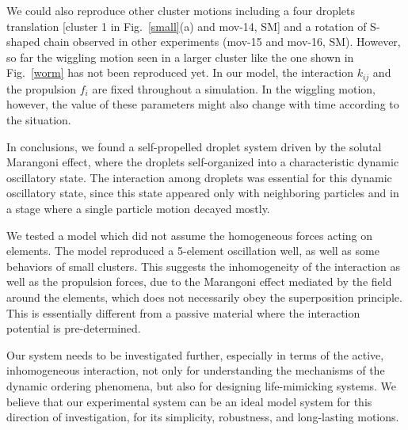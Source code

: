 \documentclass[showpacs]{revtex4-1}
\begin{document}
We could also reproduce other cluster
motions including a four droplets translation [cluster 1 in
Fig.~\ref{small}(a) and mov-14, SM] and a rotation of S-shaped chain
observed in other experiments (mov-15 and mov-16, SM).  However, so far
the wiggling motion seen in a larger cluster like the one shown in
Fig.~\ref{worm} has not been reproduced yet. In our model, the
interaction $k_{ij}$ and the propulsion $f_i$ are fixed throughout a
simulation. In the wiggling motion, however, the value of these
parameters might also change with time according to the situation.

 In conclusions, we found a self-propelled droplet system driven by the
solutal Marangoni effect, where the droplets self-organized into a
characteristic dynamic oscillatory state. The interaction among droplets
was essential for this dynamic oscillatory state, since this state
appeared only with neighboring particles and in a stage where a
single particle motion decayed mostly.

We tested a model which did not assume the homogeneous forces acting on
elements. The model reproduced a 5-element oscillation well, as well as
some behaviors of small clusters. This suggests the inhomogeneity of the
interaction as well as the propulsion forces, due to the Marangoni
effect mediated by the field around the elements, which does not
necessarily obey the superposition principle. This is essentially
different from a passive material where the interaction potential is
pre-determined.


Our system needs to be investigated further, especially in terms of the
active, inhomogeneous interaction, not only for understanding the
mechanisms of the dynamic ordering phenomena, but
also for designing life-mimicking systems. We believe that our
experimental system can be an ideal model system for this direction of
investigation, for its simplicity, robustness, and long-lasting motions.
\end{document}
